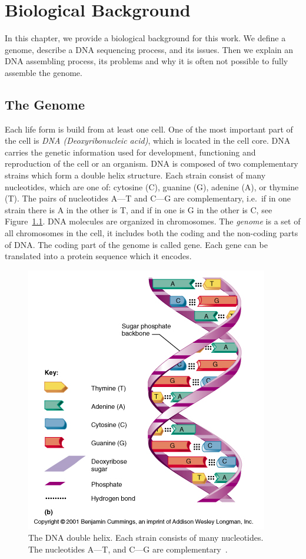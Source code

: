 \chapter{Biological Background}\label{chap:biointro}

In this chapter, we provide a biological background for this work.
We define a genome, describe a DNA sequencing process, and its issues. Then we explain an DNA assembling process, its problems and why it is often not possible to fully assemble the genome.

\section{The Genome}

Each life form is build from at least one cell. One of the most important part of the cell is \emph{DNA (Deoxyribonucleic acid)}, which is located in the cell core.
DNA carries the genetic information used for development, functioning and reproduction of the cell or an organism.
DNA is composed of two complementary strains which form a double helix structure. Each strain consist of many nucleotides, which are one of: cytosine (C), guanine (G), adenine (A), or thymine (T).
The pairs of nucleotides A---T and C---G are complementary, i.e.\ if in one strain there is A in the other is T, and if in one is G in the other is C, see Figure~\ref{fig:dnahelix}.
DNA molecules are organized in chromosomes.
The \emph{genome} is a set of all chromosomes in the cell, it includes both the coding and the non-coding parts of DNA.\@
The coding part of the genome is called gene. Each gene can be translated into a protein sequence which it encodes.

\begin{figure}[htbp]
  \centering
  \includegraphics[width=.5\textwidth]{../figures/dna-helix}
  \caption[DNA double helix]{The DNA double helix. Each strain consists of many nucleotides. The nucleotides A---T, and C---G are complementary~\cite{dnahelix}.}\label{fig:dnahelix}
\end{figure}

